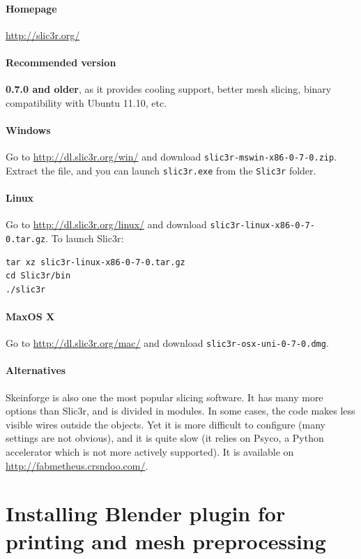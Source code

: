 \documentclass{article}
\begin{document}
	\paragraph{Homepage} \url{http://slic3r.org/}

	\paragraph{Recommended version} \textbf{0.7.0 and older}, as it provides cooling support, better mesh slicing, binary compatibility with Ubuntu 11.10, etc.

	\paragraph{Windows} Go to \url{http://dl.slic3r.org/win/} and download \texttt{slic3r-mswin-x86-0-7-0.zip}. Extract the file, and you can launch \texttt{slic3r.exe} from the \texttt{Slic3r} folder.

	\paragraph{Linux} Go to \url{http://dl.slic3r.org/linux/} and download \texttt{slic3r-linux-x86-0-7-0.tar.gz}. To launch Slic3r:
		\begin{verbatim}
tar xz slic3r-linux-x86-0-7-0.tar.gz
cd Slic3r/bin
./slic3r
		\end{verbatim}

	\paragraph{MaxOS X} Go to \url{http://dl.slic3r.org/mac/} and download \texttt{slic3r-osx-uni-0-7-0.dmg}. %

	\paragraph{Alternatives} Skeinforge is also one the most popular slicing software. It has many more options than Slic3r, and is divided in modules. In some cases, the code makes less visible wires outside the objects. Yet it is more difficult to configure (many settings are not obvious), and it is quite slow (it relies on Psyco, a Python accelerator which is not more actively supported). It is available on \url{http://fabmetheus.crsndoo.com/}.

\newpage

\section{Installing Blender plugin for printing and mesh preprocessing}
\end{document}
